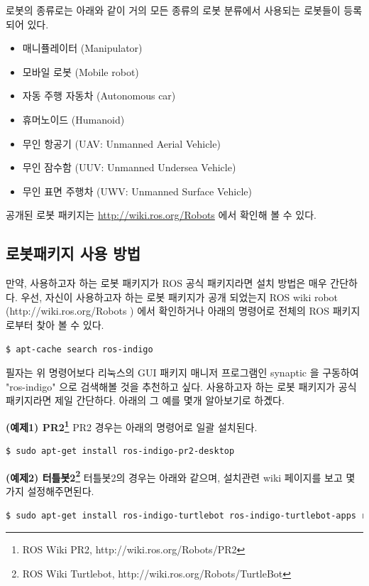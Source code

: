 로봇의 종류로는 아래와 같이 거의 모든 종류의 로봇 분류에서 사용되는 로봇들이 등록되어 있다.

\begin{itemize}
\item 매니퓰레이터 (Manipulator)
\item 모바일 로봇 (Mobile robot)
\item 자동 주행 자동차 (Autonomous car)
\item 휴머노이드 (Humanoid)
\item 무인 항공기 (UAV: Unmanned Aerial Vehicle)
\item 무인 잠수함 (UUV: Unmanned Undersea Vehicle)
\item 무인 표면 주행차 (UWV: Unmanned Surface Vehicle) 
\end{itemize}

공개된 로봇 패키지는 \url{http://wiki.ros.org/Robots} 에서 확인해 볼 수 있다.

\subsection{로봇패키지 사용 방법}

만약, 사용하고자 하는 로봇 패키지가 ROS 공식 패키지라면 설치 방법은 매우 간단하다. 우선, 자신이 사용하고자 하는 로봇 패키지가 공개 되었는지 ROS wiki robot (http://wiki.ros.org/Robots ) 에서 확인하거나 아래의 명령어로 전체의 ROS 패키지로부터 찾아 볼 수 있다.

\begin{lstlisting}[language=bash]
$ apt-cache search ros-indigo
\end{lstlisting}

필자는 위 명령어보다 리눅스의 GUI 패키지 매니저 프로그램인 synaptic 을 구동하여  "ros-indigo" 으로 검색해볼 것을 추천하고 싶다. 사용하고자 하는 로봇 패키지가 공식 패키지라면 제일 간단하다. 아래의 그 예를 몇개 알아보기로 하곘다.

\textbf{(예제1) PR2\footnote{ROS Wiki PR2, http://wiki.ros.org/Robots/PR2}}
PR2 경우는 아래의 명령어로 일괄 설치된다.
\begin{lstlisting}[language=bash]
$ sudo apt-get install ros-indigo-pr2-desktop
\end{lstlisting}

\textbf{(예제2) 터틀봇2\footnote{ROS Wiki Turtlebot, http://wiki.ros.org/Robots/TurtleBot}}
터틀봇2의 경우는 아래와 같으며, 설치관련 wiki 페이지를 보고 몇가지 설정해주면된다.
\begin{lstlisting}[language=bash]
$ sudo apt-get install ros-indigo-turtlebot ros-indigo-turtlebot-apps ros-indigo-turtlebot-viz ros-indigo-turtlebot-simulator ros-indigo-kobuki-ftdi
\end{lstlisting}

